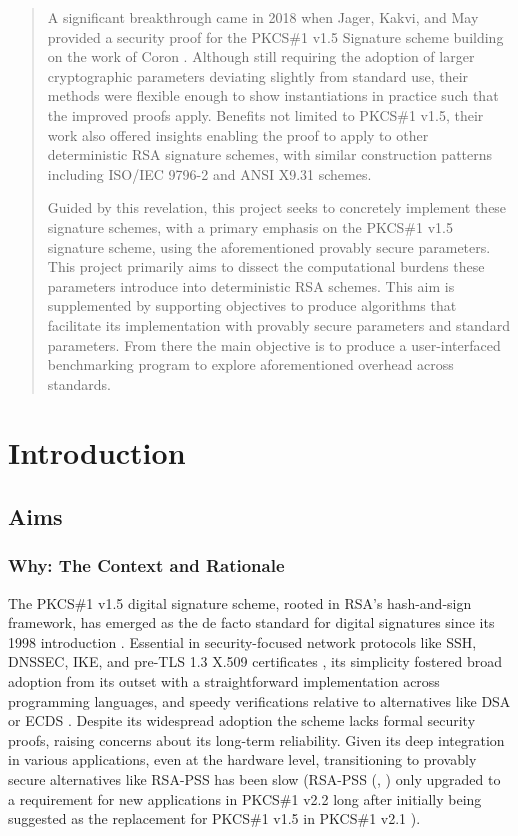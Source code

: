 \documentclass[]{final_report}
\theoremstyle{definition}
\begin{document}
\begin{abstract}
A significant breakthrough came in 2018 when Jager, Kakvi, and May \cite{jager2018security} provided a security proof for the PKCS\#1 v1.5 Signature scheme building on the work of Coron \cite{coron2002security}. Although still requiring the adoption of larger cryptographic parameters deviating slightly from standard use, their methods were flexible enough to show instantiations in practice such that the improved proofs apply. Benefits not limited to PKCS\#1 v1.5, their work also offered insights enabling the proof to apply to other deterministic RSA signature schemes, with similar construction patterns including ISO/IEC 9796-2 and ANSI X9.31 schemes.

Guided by this revelation, this project seeks to concretely implement these signature schemes, with a primary emphasis on the PKCS\#1 v1.5 signature scheme, using the aforementioned provably secure parameters. This project primarily aims to dissect the computational burdens these parameters introduce into deterministic RSA schemes. This aim is supplemented by supporting objectives to produce algorithms that facilitate its implementation with provably secure parameters and standard parameters. From there the main objective is to produce a user-interfaced benchmarking program to explore aforementioned overhead across standards. 
\newpage
\end{abstract}
\newpage


\chapter{Introduction}


\section{Aims}

\subsection{Why: The Context and Rationale}
The PKCS\#1 v1.5 digital signature scheme, rooted in RSA's hash-and-sign framework, has emerged as the de facto standard for digital signatures since its 1998 introduction \cite{rfc2313}. Essential in security-focused network protocols like SSH, DNSSEC, IKE, and pre-TLS 1.3 X.509 certificates \cite{schaad2005additional}, its simplicity fostered broad adoption from its outset with a straightforward implementation across programming languages, and speedy verifications relative to alternatives like DSA or ECDS  \cite{jager2018security}. 
Despite its widespread adoption the scheme lacks formal security proofs, raising concerns about its long-term reliability.
Given its deep integration in various applications, even at the hardware level, transitioning to provably secure alternatives like RSA-PSS has been slow (RSA-PSS (\cite{bellare1996exact}, \cite{jonsson2001security}) only upgraded to a requirement for new applications in PKCS\#1 v2.2 \cite{rfc8017} long after initially being suggested as the replacement for PKCS\#1 v1.5 in PKCS\#1 v2.1 \cite{rfc3447}).
\end{document}
